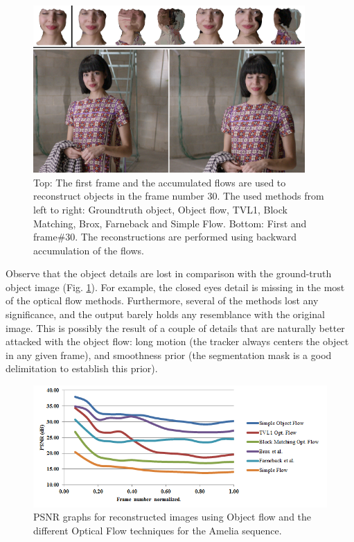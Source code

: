    \begin{figure}[t]
      \centering
      \includegraphics[width=0.925\textwidth]{../images/compare2.png}
      \caption{Top: The first frame and the accumulated flows are used to reconstruct objects in the frame number 30. The used methods from left to right: Groundtruth object, Object flow, TVL1, Block Matching, Brox, Farneback and Simple Flow. 
		Bottom: First and frame\#30. The reconstructions are performed using backward accumulation of the flows.}
      \label{compare2}
   \end{figure}


Observe that the object details are lost in comparison with the ground-truth object image (Fig. \ref{compare2}). For example, the closed eyes detail is missing in the most of the optical 
flow methods. Furthermore, several of the methods lost any significance, and the output barely holds any resemblance with the original image. This is possibly the result of a couple of details that are naturally better attacked with the object flow: 
long motion (the tracker always centers the object in any given frame), and smoothness prior (the segmentation mask is a 
good delimitation to establish this prior).

   \begin{figure}[th]
      \centering
      \includegraphics[width=1.0\textwidth]{../images/psnr2.png}
      \caption{PSNR graphs for reconstructed images using Object flow and the different Optical Flow techniques for the Amelia sequence. }
      \label{of_res2}
   \end{figure}

